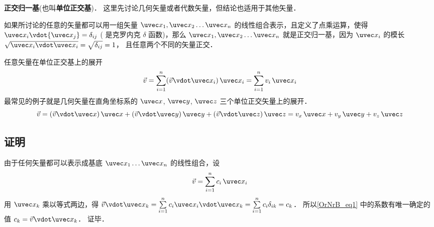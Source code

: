 
\textbf{正交归一基}(也叫\textbf{单位正交基})．
这里先讨论几何矢量或者代数矢量，但结论也适用于其他矢量．

如果所讨论的任意的矢量都可以用一组矢量 $\uvec x_1,\uvec x_2\dots\uvec x_n$ 的线性组合表示，且定义了点乘运算，使得 ${\uvec x_i}\vdot{\uvec x_j} = {\delta _{ij}}$ ( 是克罗内克 $\delta$ 函数)，那么 ${\uvec x_1},{\uvec x_2}\dots{\uvec x_n}$ 就是正交归一基，因为 $\uvec x_i$ 的模长 $\sqrt{\uvec x_i \vdot \uvec x_i} = \sqrt{\delta _{ij}}= 1$， 且任意两个不同的矢量正交．

任意矢量在单位正交基上的展开
 \begin{equation}
\vec v = \sum\limits_{i = 1}^n (\vec v\vdot\uvec x_i)\,\uvec x_i = \sum\limits_{i = 1}^n v_i \,\uvec x_i
\end{equation}
最常见的例子就是几何矢量在直角坐标系的 $\uvec x$, $\uvec y$, $\uvec z$ 三个单位正交矢量上的展开．
 \begin{equation}
\vec v = (\vec v \vdot \uvec x)\,\uvec x + (\vec v \vdot \uvec y)\,\uvec y + (\vec v \vdot \uvec z)\,\uvec z = v_x \,\uvec x + v_y \,\uvec y + v_z \,\uvec z
\end{equation} 

\subsection{证明}
由于任何矢量都可以表示成基底 ${\uvec x_1}\dots{\uvec x_n}$ 的线性组合，设
\begin{equation}\label{OrNrB_eq1}
\vec v = \sum\limits_{i = 1}^n {{c_i}{{\,\uvec x}_i}} 
\end{equation} 
用 ${\uvec x_k}$ 乘以等式两边，得 $\vec v{\vdot\uvec x_k} = \sum\limits_{i = 1}^n {{c_i}{{\uvec x}_i}{{\vdot\uvec x}_k}}  = \sum\limits_{i = 1}^n {{c_i}{\delta _{ik}}}  = {c_k}$． 所以\autoref{OrNrB_eq1} 中的系数有唯一确定的值 ${c_k} = \vec v{\vdot\uvec x_k}$． 证毕．






